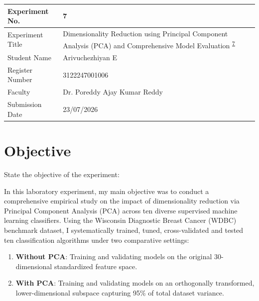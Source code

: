 \documentclass[12pt,a4paper]{article}
\begin{document}

\begin{tabular}{|p{4cm}|p{11cm}|}
\hline
Experiment No. & 7 \\ \hline
Experiment Title & Dimensionality Reduction using Principal Component Analysis (PCA) and Comprehensive Model Evaluation \textsuperscript{\href{https://github.com/arivuchezhiyan/Machine_Learning/tree/main/experiment_7}{7}} \\ \hline
Student Name & Arivuchezhiyan E \\ \hline
Register Number & 3122247001006 \\ \hline
Faculty & Dr. Poreddy Ajay Kumar Reddy \\ \hline
Submission Date & 23/07/2026 \\ \hline
\end{tabular}

\vspace{0.5cm}

\section{Objective}
State the objective of the experiment:

In this laboratory experiment, my main objective was to conduct a comprehensive empirical study on the impact of dimensionality reduction via Principal Component Analysis (PCA) across ten diverse supervised machine learning classifiers. Using the Wisconsin Diagnostic Breast Cancer (WDBC) benchmark dataset, I systematically trained, tuned, cross-validated and tested ten classification algorithms under two comparative settings:
\begin{enumerate}
\item \textbf{Without PCA}: Training and validating models on the original 30-dimensional standardized feature space.
\item \textbf{With PCA}: Training and validating models on an orthogonally transformed, lower-dimensional subspace capturing 95\% of total dataset variance.
\end{enumerate}
\end{document}
